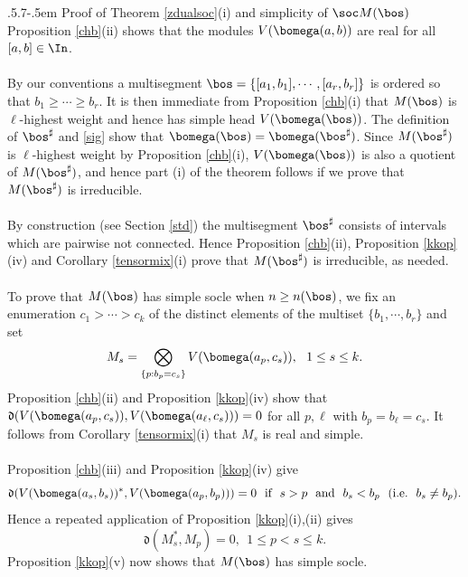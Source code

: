 \documentclass[11pt,reqno]{amsart}
\makeatletter
\theoremstyle{definition} \newtheorem*{defn}{Definition}
\theoremstyle{definition}
\numberwithin{equation}{section}
\newcommand{\lie}[1]{\mathfrak{#1}}
\def\subsection{\def\@secnumfont{\bfseries}\@startsection{subsection}{2}%
  {\parindent}{.5\linespacing\@plus.7\linespacing}{-.5em}%
  {\normalfont\bfseries}}
\makeatother
\begin{document}
\subsection{Proof of Theorem \ref{zdualsoc}(i) and simplicity of $\soc M(\bos)$} \label{pfi} Proposition \ref{chb}(ii) shows that the modules $V(\bomega(a,b))$ are real for all $[a,b]\in\In$.\\\\
By our conventions a multisegment $\bos=\{[a_1,b_1],\cdots, [a_r, b_r]\}$ is ordered so that $b_1\ge\cdots\ge b_r$. It is then immediate from Proposition \ref{chb}(i) that $M(\bos)$ is $\ell$-highest weight and hence has simple head $V(\bomega(\bos))$. The definition of $\bos^\sharp$ and \eqref{sig} show that $\bomega(\bos)=\bomega(\bos^\sharp)$. Since $M(\bos^\sharp)$ is $\ell$-highest weight by Proposition \ref{chb}(i), $V(\bomega(\bos))$ is also a quotient of $M(\bos^\sharp)$, and hence part (i) of the theorem follows if we prove that $M(\bos^\sharp)$ is irreducible.
\\\\
By construction (see Section \ref{std}) the multisegment $\bos^\sharp$ consists of intervals which are pairwise not connected. Hence Proposition \ref{chb}(ii), Proposition \ref{kkop}(iv) and Corollary \ref{tensormix}(i) prove that $M(\bos^\sharp)$ is irreducible, as needed. \\\\
 To prove that $M(\bos)$ has simple socle when $n\ge n(\bos)$, we fix
an enumeration  $c_1>\cdots>c_k$ of the distinct elements of the multiset $\{b_1,\cdots, b_r\}$ and set
$$M_s= \bigotimes_{\{p: b_p=c_s\}} V(\bomega(a_p, c_s)),\ \ 1\le s\le k.$$ Proposition \ref{chb}(ii) and Proposition \ref{kkop}(iv) show that $\lie d(V(\bomega(a_p, c_s)), V(\bomega(a_\ell, c_s)))=0$ for all $p,\ell$ with $b_p=b_\ell=c_s$. It follows from Corollary \ref{tensormix}(i) that $M_s$ is real and simple. \\\\ Proposition \ref{chb}(iii) and Proposition \ref{kkop}(iv) give $$\lie d( V(\bomega(a_s, b_s))^*, V(\bomega(a_p,b_p)))=0\ \ \text{if}\ \ s>p\ \ {\rm and}\ \ b_s<b_p\ \ ({\rm i.e.}\ \ b_s\ne b_p). $$ Hence a repeated application of  Proposition \ref{kkop}(i),(ii) gives
$$\lie d(M_s^*, M_p)=0,\ \ 1\le p<s\le k. $$ Proposition \ref{kkop}(v) now shows that $M(\bos)$ has simple socle.
\end{document}
